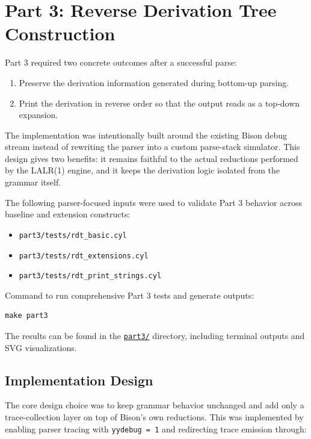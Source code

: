 \documentclass[a4paper,12pt]{article}
\begin{document}
\newpage
\section{Part 3: Reverse Derivation Tree Construction}

Part 3 required two concrete outcomes after a successful parse:
\begin{enumerate}
    \item Preserve the derivation information generated during bottom-up parsing.
    \item Print the derivation in reverse order so that the output reads as a top-down expansion.
\end{enumerate}

The implementation was intentionally built around the existing Bison debug stream instead of rewriting the parser into a custom parse-stack simulator. This design gives two benefits: it remains faithful to the actual reductions performed by the LALR(1) engine, and it keeps the derivation logic isolated from the grammar itself.

\vspace{0.5cm}

The following parser-focused inputs were used to validate Part 3 behavior across baseline and extension constructs:
\begin{itemize}
    \item \texttt{part3/tests/rdt\_basic.cyl}
    \item \texttt{part3/tests/rdt\_extensions.cyl}
    \item \texttt{part3/tests/rdt\_print\_strings.cyl}
\end{itemize}

Command to run comprehensive Part 3 tests and generate outputs:
\begin{lstlisting}[language=C]
make part3
\end{lstlisting}
The results can be found in the \href{https://github.com/ShardulJunagade/compilers-cylite/tree/main/cylite_A3/part3}{\texttt{part3/}} directory, including terminal outputs and SVG visualizations.

\subsection{Implementation Design}

The core design choice was to keep grammar behavior unchanged and add only a trace-collection layer on top of Bison's own reductions. This was implemented by enabling parser tracing with \texttt{yydebug = 1} and redirecting trace emission through:
\end{document}
